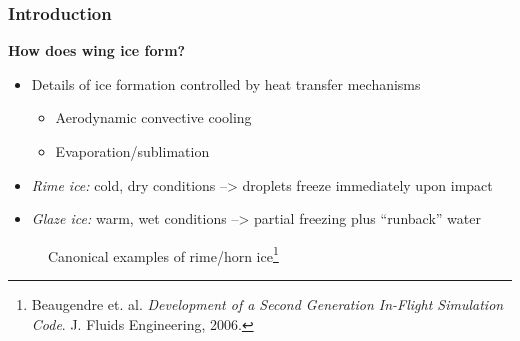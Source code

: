 \documentclass[9pt]{beamer}
\begin{document}
\begin{frame}
\frametitle{Introduction}
\label{sec-1-5}

\textbf{How does wing ice form?}
\begin{itemize}
\item Details of ice formation controlled by heat transfer mechanisms
\begin{itemize}
\item Aerodynamic convective cooling
\item Evaporation/sublimation
\end{itemize}
\item \emph{Rime ice:} cold, dry conditions --> droplets freeze immediately upon impact
\item \emph{Glaze ice:} warm, wet conditions --> partial freezing plus ``runback'' water
\end{itemize}

\vspace*{-0.4cm}\begin{figure} 
      \caption{Canonical examples of rime/horn ice\footnote{\tiny
      Beaugendre et. al. \emph{Development of a Second Generation
      In-Flight Simulation Code}. J. Fluids Engineering, 2006.}}
\end{figure}
\end{frame}
\end{document}
